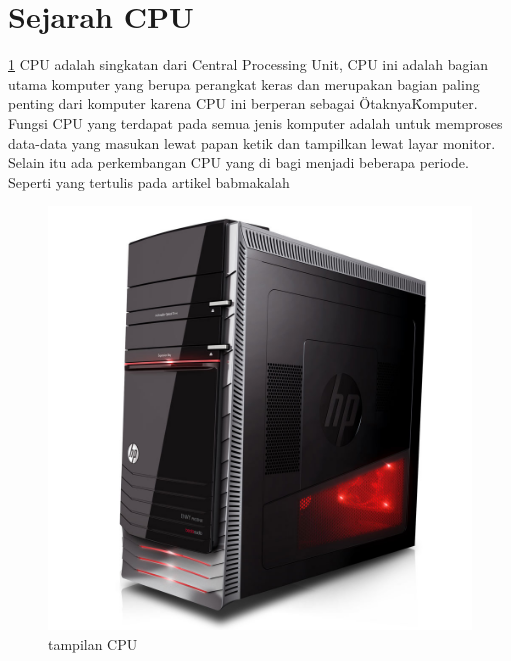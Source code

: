 	


	\section{Sejarah CPU}
	\ref{CPU}
CPU adalah singkatan dari Central Processing Unit, CPU ini adalah bagian utama komputer yang berupa perangkat keras dan merupakan bagian paling penting dari komputer karena CPU ini berperan sebagai \"Otaknya\" Komputer. Fungsi CPU yang terdapat pada semua jenis komputer adalah untuk memproses data-data yang masukan lewat papan ketik dan tampilkan lewat layar monitor. Selain itu ada perkembangan CPU yang di bagi menjadi beberapa periode. Seperti yang tertulis pada artikel babmakalah \cite{babmakalah}


\begin{figure}[ht]
\centerline{\includegraphics[width=1\textwidth]{figures/CPU.jpg}}
\caption{tampilan CPU}
\label{CPU}
\end{figure}

